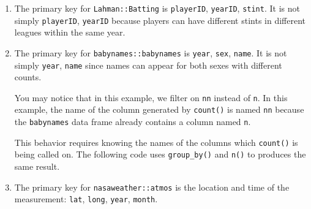 \documentclass[]{book}
\newenvironment{Shaded}{\begin{snugshade}}{\end{snugshade}}
\newcommand{\CommentTok}[1]{\textcolor[rgb]{0.56,0.35,0.01}{\textit{#1}}}
\newcommand{\DecValTok}[1]{\textcolor[rgb]{0.00,0.00,0.81}{#1}}
\newcommand{\KeywordTok}[1]{\textcolor[rgb]{0.13,0.29,0.53}{\textbf{#1}}}
\newcommand{\NormalTok}[1]{#1}
\newcommand{\OperatorTok}[1]{\textcolor[rgb]{0.81,0.36,0.00}{\textbf{#1}}}
\newcommand{\StringTok}[1]{\textcolor[rgb]{0.31,0.60,0.02}{#1}}
\theoremstyle{plain}
\theoremstyle{remark}
\begin{document}
\begin{enumerate}
\def\labelenumi{\arabic{enumi}.}
\item
  The primary key for \texttt{Lahman::Batting} is \texttt{playerID}, \texttt{yearID}, \texttt{stint}.
  It is not simply \texttt{playerID}, \texttt{yearID} because players can have different stints in different leagues within the same year.

\begin{Shaded}
\end{Shaded}
\item
  The primary key for \texttt{babynames::babynames} is \texttt{year}, \texttt{sex}, \texttt{name}.
  It is not simply \texttt{year}, \texttt{name} since names can appear for both sexes with different counts.

\begin{Shaded}
\end{Shaded}

  You may notice that in this example, we filter on \texttt{nn} instead of \texttt{n}.
  In this example, the name of the column generated by \texttt{count()} is named \texttt{nn}
  because the \texttt{babynames} data frame already contains a column named \texttt{n}.

  This behavior requires knowing the names of the columns which \texttt{count()}
  is being called on. The following code uses \texttt{group\_by()} and \texttt{n()} to
  produces the same result.

\begin{Shaded}
\end{Shaded}
\item
  The primary key for \texttt{nasaweather::atmos} is the location and time of the measurement: \texttt{lat}, \texttt{long}, \texttt{year}, \texttt{month}.


\end{enumerate}
\end{document}
